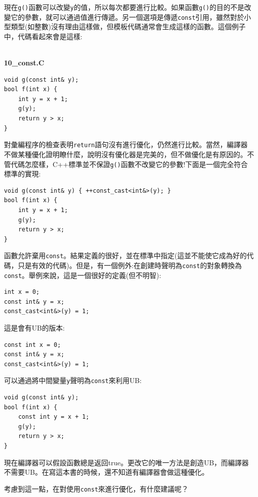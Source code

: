 現在\texttt{g()}函數可以改變\texttt{y}的值，所以每次都要進行比較。如果函數\texttt{g()}的目的不是改變它的參數，就可以通過值進行傳遞。另一個選項是傳遞\texttt{const}引用，雖然對於小型類型(如整數)沒有理由這樣做，但模板代碼通常會生成這樣的函數。這個例子中，代碼看起來會是這樣:

\hspace*{\fill} \\ %
\noindent
\textbf{10\_const.C}
\begin{lstlisting}[style=styleCXX]
void g(const int& y);
bool f(int x) {
	int y = x + 1;
	g(y);
	return y > x;
}
\end{lstlisting}

對彙編程序的檢查表明\texttt{return}語句沒有進行優化，仍然進行比較。當然，編譯器不做某種優化證明瞭什麼，說明沒有優化器是完美的，但不做優化是有原因的。不管代碼怎麼樣，C++標準並不保證\texttt{g()}函數不改變它的參數!下面是一個完全符合標準的實現:

\begin{lstlisting}[style=styleCXX]
void g(const int& y) { ++const_cast<int&>(y); }
bool f(int x) {
	int y = x + 1;
	g(y);
	return y > x;
}
\end{lstlisting}

函數允許棄用\texttt{const}。結果定義的很好，並在標準中指定(這並不能使它成為好的代碼，只是有效的代碼)。但是，有一個例外:在創建時聲明為\texttt{const}的對象轉換為\texttt{const}。舉例來說，這是一個很好的定義(但不明智):

\begin{lstlisting}[style=styleCXX]
int x = 0;
const int& y = x;
const_cast<int&>(y) = 1;
\end{lstlisting}

這是會有UB的版本:

\begin{lstlisting}[style=styleCXX]
const int x = 0;
const int& y = x;
const_cast<int&>(y) = 1;
\end{lstlisting}

可以通過將中間變量\texttt{y}聲明為\texttt{const}來利用UB:

\begin{lstlisting}[style=styleCXX]
void g(const int& y);
bool f(int x) {
	const int y = x + 1;
	g(y);
	return y > x;
}
\end{lstlisting}

現在編譯器可以假設函數總是返回true。更改它的唯一方法是創造UB，而編譯器不需要UB。在寫這本書的時候，還不知道有編譯器會做這種優化。

考慮到這一點，在對使用\texttt{const}來進行優化，有什麼建議呢？

